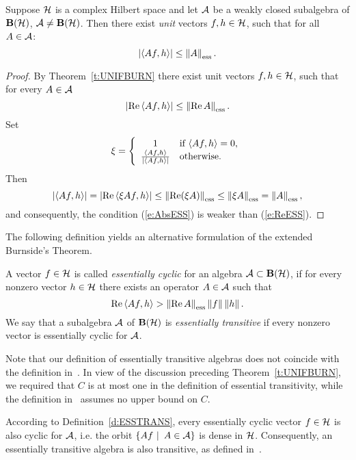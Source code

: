 \begin{cor}\label{c:UNIFBURN}
Suppose ${\cal H}$ is a complex Hilbert space and let ${\cal A}$ be a
weakly closed subalgebra of $\mathbf B(\cal H)$, ${\cal A}\neq\mathbf B(\cal H)$. Then there
exist {\em unit} vectors $f,h\in{\cal H}$, such that for all
$A\in{\cal A}$:
\begin{equation}\label{e:AbsESS}
  \abs{\seq{A f,h}}\leq\essnorm{A}.
\end{equation}
\end{cor}

\begin{proof}
By Theorem~\ref{t:UNIFBURN} there exist unit vectors
$f,h\in{\cal H}$, such that for every $A\in{\cal A}$
\[ \abs{\RE{\seq{A f,h}}}\leq\essnorm{\RE{A}}. \]
Set
\[ \xi = \left\lbrace
           \begin{array}{c l}
              1 & \text{if $\left<A{}f,h\right>=0$},\\
              \tfrac{\left<A{}f,h\right>}{\left\vert\left<A{}f,h\right>\right\vert} & \text{otherwise}.
           \end{array}
         \right. \]
Then
\[ \abs{\seq{A f,h}} = \abs{\RE\seq{\xi A f,h}} \leq \essnorm{\RE(\xi A)}
   \leq \essnorm{\xi A} = \essnorm{A}, \]
and consequently, the condition (\ref{e:AbsESS}) is weaker than
(\ref{e:ReESS}).
\end{proof}

\smallskip

The following definition yields an alternative formulation of
the extended Burnside's Theorem.

\begin{defn}\label{d:ESSTRANS}
A vector $f\in{\cal H}$ is called {\em essentially cyclic} for an
algebra ${\cal A}\subset\mathbf B(\cal H)$, if for every nonzero vector $h\in{\cal H}$
there exists an operator $A\in{\cal A}$ such that
\begin{equation*}
  \RE{\seq{A f,h}} > \essnorm{\RE{A}}\norm{f}\norm{h}.
\end{equation*}
We say that a subalgebra ${\cal A}$ of $\mathbf B(\cal H)$ is {\em essentially
transitive} if every nonzero vector is essentially cyclic for
${\cal A}$.
\end{defn}

\begin{rem}
Note that our definition of essentially transitive algebras
does not coincide with the definition in~\cite{Lom91}. In view
of the discussion preceding Theorem~\ref{t:UNIFBURN}, we
required that $C$ is at most one in the definition of essential
transitivity, while the definition in~\cite{Lom91} assumes no
upper bound on $C$.

\smallskip

According to Definition~\ref{d:ESSTRANS}, every essentially
cyclic vector $f\in{\cal H}$ is also cyclic for ${\cal A}$, i.e. the orbit
$\left\{A{f}\,\,|\,\,\,A\in{\cal A}\right\}$ is dense in ${\cal H}$. Consequently,
an essentially transitive algebra is also transitive, as
defined in~\cite{RR73}.
\end{rem}

